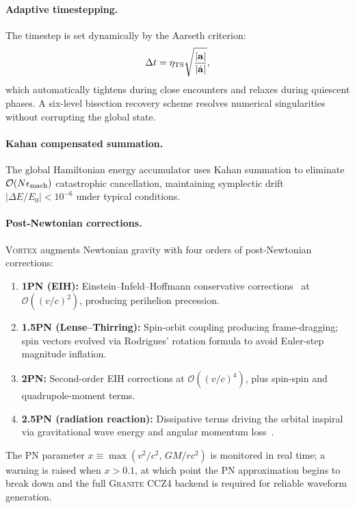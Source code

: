 \documentclass[aps,prd,twocolumn,superscriptaddress,nofootinbib,showpacs,
               longbibliography]{revtex4-2}
\newcommand{\granite}{\textsc{Granite}}
\newcommand{\order}[1]{\mathcal{O}(#1)}
\begin{document}
\paragraph{Adaptive timestepping.}
The timestep is set dynamically by the Aarseth criterion:
\begin{equation}
  \Delta t = \eta_{\rm TS}\sqrt{\frac{|\mathbf{a}|}{|\dot{\mathbf{a}}|}},
\end{equation}
which automatically tightens during close encounters and relaxes during
quiescent phases.
A six-level bisection recovery scheme resolves numerical singularities
without corrupting the global state.

\paragraph{Kahan compensated summation.}
The global Hamiltonian energy accumulator uses Kahan summation
to eliminate $\order{N\epsilon_{\rm mach}}$ catastrophic cancellation,
maintaining symplectic drift $|\Delta E/E_0| < 10^{-6}$ under typical
conditions.

\paragraph{Post-Newtonian corrections.}
\textsc{Vortex} augments Newtonian gravity with four orders of
post-Newtonian corrections:
\begin{enumerate}[nosep]
  \item \textbf{1PN (EIH):} Einstein--Infeld--Hoffmann conservative
    corrections~\cite{Will2014} at $\order{(v/c)^2}$, producing perihelion
    precession.
  \item \textbf{1.5PN (Lense--Thirring):} Spin-orbit coupling producing
    frame-dragging; spin vectors evolved via Rodrigues' rotation formula
    to avoid Euler-step magnitude inflation.
  \item \textbf{2PN:} Second-order EIH corrections at $\order{(v/c)^4}$,
    plus spin-spin and quadrupole-moment terms.
  \item \textbf{2.5PN (radiation reaction):} Dissipative terms driving
    the orbital inspiral via gravitational wave energy and angular
    momentum loss~\cite{Peters1964}.
\end{enumerate}
The PN parameter $x \equiv \max(v^2/c^2,\,GM/rc^2)$ is monitored in
real time; a warning is raised when $x > 0.1$, at which point the
PN approximation begins to break down and the full \granite{} CCZ4
backend is required for reliable waveform generation.
\end{document}
